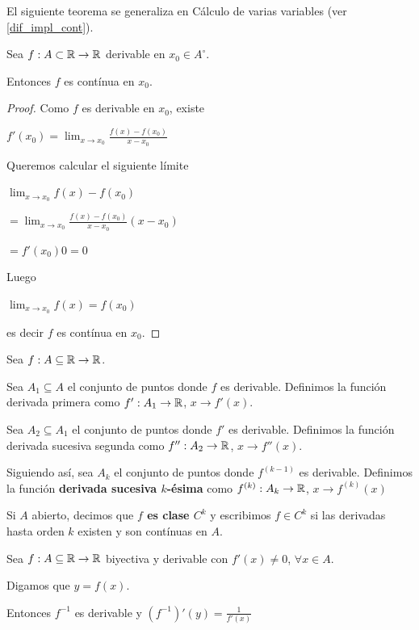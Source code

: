 
El siguiente teorema se generaliza en Cálculo de varias variables (ver \ref{dif_impl_cont}).

\begin{theorem} \label{deriv_impl_cont}
Sea $ f : A \subset \mathbb{R} \to \mathbb{R}$ derivable en $ x_0 \in A^{\circ}$.

Entonces $f$ es contínua en $x_0$.
\end{theorem}

\begin{proof}
Como $f$ es derivable en $x_0$, existe

$f'(x_0) = \lim_{x \to x_0} \frac{f(x) - f(x_0)}{x - x_0}$

Queremos calcular el siguiente límite

$ \lim_{x \to x_0} f(x) - f(x_0)$

$ = \lim_{x \to x_0} \frac{f(x) - f(x_0)}{x - x_0} (x - x_0)$

$ = f'(x_0) 0 = 0$

Luego

$ \lim_{x \to x_0} f(x) = f(x_0)$

es decir $f$ es contínua en $x_0$.
\end{proof}

\begin{definition}[Sucesivas]
Sea $f:A \subseteq \mathbb{R} \to \mathbb{R}$.

Sea $A_1 \subseteq A$ el conjunto de puntos donde $f$ es derivable.  Definimos la función derivada primera como $f' : A_1 \to \mathbb{R}$, $x \to f'(x)$.

Sea $A_2 \subseteq A_1$ el conjunto de puntos donde $f'$ es derivable.  Definimos la función derivada sucesiva segunda como $f'' : A_2 \to \mathbb{R}$, $x \to f''(x)$.

Siguiendo así, sea $A_k$ el conjunto de puntos donde $f^{(k-1)}$ es derivable.  Definimos la función \textbf{derivada sucesiva $k$-ésima} como $f^{(k)} : A_k \to \mathbb{R}$, $x \to f^{(k)}(x)$

Si $A$ abierto, decimos que \textbf{$f$ es clase $C^k$} y escribimos $f \in C^k$ si las derivadas hasta orden $k$ existen y son contínuas en $A$.
\end{definition}

\begin{theorem}[Inversa]
Sea $f : A \subseteq \mathbb{R} \to \mathbb{R}$ biyectiva y derivable con $f'(x) \neq 0$, $\forall x \in A$.

Digamos que $y = f(x)$.

Entonces $f^{-1}$ es derivable y $(f^{-1})'(y) = \frac{1}{f'(x)}$

\end{theorem}

